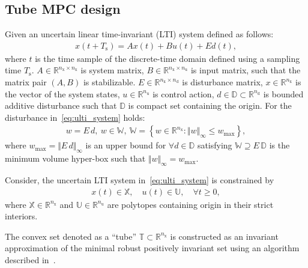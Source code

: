 \documentclass[letterpaper, 10 pt, conference]{ieeeconf}
\begin{document}
	\subsection{Tube MPC design}
	\label{sec:tube_mpc}
	
	Given an uncertain linear time-invariant (LTI) system defined as follows:
	\begin{eqnarray}
		\label{eq:ulti_system}
		x(t+T_{\mathrm{s}}) = A x(t) + B u(t) + E d(t), %
	\end{eqnarray}
	where $t$ is the time sample of the discrete-time domain defined using a sampling time $T_{\mathrm{s}}$. $A \in \mathbb{R}^{n_{\mathrm{x}} \times n_{\mathrm{x}}}$ is system matrix, $B \in \mathbb{R}^{n_{\mathrm{x}} \times n_{\mathrm{u}}}$ is input matrix, such that the matrix pair $(A,B)$ is stabilizable. $E \in \mathbb{R}^{n_{\mathrm{x}} \times n_{\mathrm{d}}}$ is disturbance matrix, $x \in \mathbb{R}^{n_{\mathrm{x}}}$ is the vector of the system states, $u \in \mathbb{R}^{n_{\mathrm{u}}}$ is control action, $d \in \mathbb{D} \subset \mathbb{R}^{n_{\mathrm{d}}}$ is bounded additive disturbance such that $\mathbb{D}$ is compact set containing the origin. 
	For the disturbance in~\eqref{eq:ulti_system} holds:
	\begin{eqnarray}
		\label{eq:disturbance_set}
		w = E \, d, ~ w \in \mathbb{W}, ~ \mathbb{W} = \left\{ w \in \mathbb{R}^{n_{\mathrm{x}}} : \Vert w \Vert_{\infty} \leq w_{\max} \right\},
	\end{eqnarray}
	where $w_{\max} = \Vert E \, d \Vert_{\infty}$ is an upper bound for $\forall d \in \mathbb{D}$ satisfying $\mathbb{W} \supseteq E \, \mathbb{D}$ is the minimum volume hyper-box such that $\Vert w \Vert_{\infty} = w_{\max}$.
	
	Consider, the uncertain LTI system in~\eqref{eq:ulti_system} is constrained by
	\begin{eqnarray}
		\label{eq:constraints_x_u}
		x(t) \in \mathbb{X}, \quad u(t) \in \mathbb{U}, \quad \forall t \geq 0,
	\end{eqnarray}
	where $\mathbb{X} \in \mathbb{R}^{n_{\mathrm{x}}}$ and $\mathbb{U} \in \mathbb{R}^{n_{\mathrm{u}}}$ are polytopes containing origin in their strict interiors. 
	
	The convex set denoted as a ``tube'' $\mathbb{T} \subset \mathbb{R}^{n_{\mathrm{x}}}$ is constructed as an invariant approximation of the minimal robust positively invariant set using an algorithm described in~\cite{RK05}.
	
	
\end{document}
